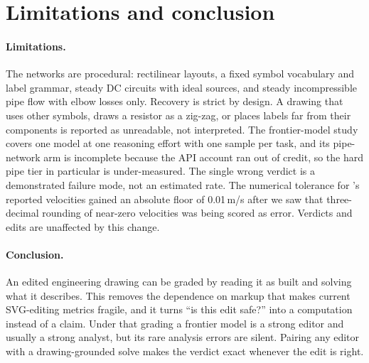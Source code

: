 \section{Limitations and conclusion}
\label{sec:conclusion}

\paragraph{Limitations.} The networks are procedural: rectilinear layouts, a fixed symbol vocabulary and
label grammar, steady DC circuits with ideal sources, and steady incompressible pipe flow with elbow losses
only. Recovery is strict by design. A drawing that uses other symbols, draws a resistor as a zig-zag, or
places labels far from their components is reported as unreadable, not interpreted. The frontier-model
study covers one model at one reasoning effort with one sample per task, and its pipe-network arm is
incomplete because the API account ran out of credit, so the hard pipe tier in particular is under-measured.
The single wrong verdict is a demonstrated failure mode, not an estimated rate. The numerical tolerance for
\astra's reported velocities gained an absolute floor of 0.01\,m/s after we saw that three-decimal rounding of
near-zero velocities was being scored as error. Verdicts and edits are unaffected by this change.

\paragraph{Conclusion.} An edited engineering drawing can be graded by reading it as built and solving what it
describes. This removes the dependence on markup that makes current SVG-editing metrics fragile, and it turns
``is this edit safe?'' into a computation instead of a claim. Under that grading a frontier model is a
strong editor and usually a strong analyst, but its rare analysis errors are silent. Pairing any editor with a
drawing-grounded solve makes the verdict exact whenever the edit is right.
\conclusionOurs

